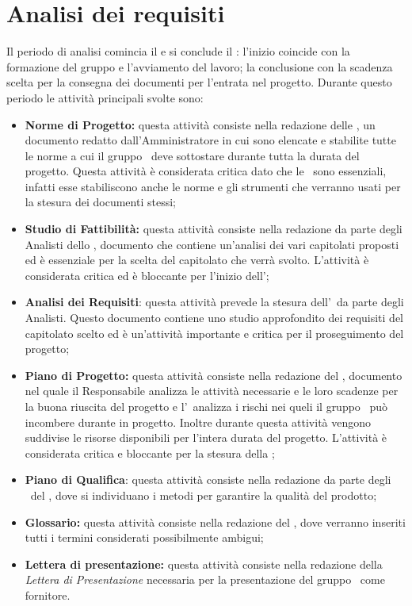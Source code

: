 \documentclass[PianoDiProgetto.tex]{subfiles}
\begin{document}
\section{Analisi dei requisiti}
Il periodo di analisi comincia il  e si conclude il : l'inizio coincide con la formazione del gruppo e l'avviamento del lavoro; la conclusione con la scadenza scelta per la consegna dei documenti per l'entrata nel progetto. Durante questo periodo le attività principali svolte sono:
\begin{itemize}
	\item \textbf{Norme di Progetto:} questa attività consiste nella redazione delle \ndp, un documento redatto dall'Amministratore in cui sono elencate e stabilite tutte le norme a cui il gruppo \gruppo\ deve sottostare durante tutta la durata del progetto. Questa attività è considerata critica dato che le \ndp\ sono essenziali, infatti esse stabiliscono anche le norme e gli strumenti che verranno usati per la stesura dei documenti stessi;
	\item \textbf{Studio di Fattibilità:} questa attività consiste nella redazione da parte degli Analisti dello \sdf, documento che contiene un'analisi dei vari capitolati proposti ed è essenziale per la scelta del capitolato che verrà svolto. L'attività è considerata critica ed è bloccante per l'inizio dell'\adr;
	
	\item \textbf{Analisi dei Requisiti}: questa attività prevede la stesura dell'\adr\ da parte degli Analisti. Questo documento contiene uno studio approfondito dei requisiti del capitolato scelto ed è un'attività importante e critica per il proseguimento del progetto;
	
	\item \textbf{Piano di Progetto:} questa attività consiste nella redazione del \pdp, documento nel quale il Responsabile analizza le attività necessarie e le loro scadenze per la buona riuscita del progetto e l'\amme\ analizza i rischi nei queli il gruppo \gruppo\ può incombere durante in progetto. Inoltre durante questa attività vengono suddivise le risorse disponibili per l'intera durata del progetto. L'attività è considerata critica e bloccante per la stesura della ;
	\item \textbf{Piano di Qualifica}: questa attività consiste nella redazione da parte degli \ammi\ del \pdq, dove si individuano i metodi per garantire la qualità del prodotto;
	\item \textbf{Glossario:} questa attività consiste nella redazione del \g, dove verranno inseriti tutti i termini considerati possibilmente ambigui;
	\item \textbf{Lettera di presentazione:} questa attività consiste nella redazione della \textit{Lettera di Presentazione} necessaria per la presentazione del gruppo \gruppo\ come fornitore. 	
\end{itemize}	
\end{document}
